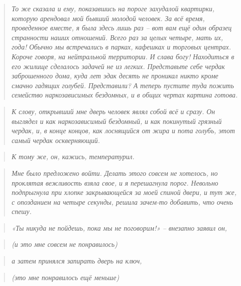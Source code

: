 \documentclass[
  a5paperpaper,
  DIV=11,
  numbers=noendperiod]{scrreprt}
\begin{document}
\begin{quote}
\emph{То же сказала и ему, показавшись на пороге захудалой квартирки,
которую арендовал мой бывший молодой человек. За всё время, проведенное
вместе, я была здесь лишь раз -- вот вам ещё один образец странности
наших отношений. Всего раз за целых четыре, мать их, года! Обычно мы
встречались в парках, кафешках и торговых центрах. Короче говоря, на
нейтральной территории. И слава богу! Находиться в его жилище сделалось
задачей не из легких. Представьте себе чердак заброшенного дома, куда
лет эдак десять не проникал никто кроме смачно гадящих голубей.
Представили? А теперь пустите туда пожить семейство наркозависимых
бездомных, и в общих чертах картина готова.}
\end{quote}

\begin{quote}
\emph{К слову, открывший мне дверь человек являл собой всё и сразу. Он
выглядел и как наркозависимый бездомный, и как покинутый грязный чердак,
и, в конце концов, как лоснящийся от жира и пота голубь, этот самый
чердак оскверняющий.}
\end{quote}

\begin{quote}
\emph{К тому же, он, кажись, температурил.}
\end{quote}

\begin{quote}
\emph{Мне было предложено войти. Делать этого совсем не хотелось, но
проклятая вежливость взяла свое, и я перешагнула порог. Невольно
подпрыгнула при хлопке закрывающейся за моей спиной двери, и тут же, с
опозданием на четыре секунды, решила зачем-то добавить, что очень
спешу.}
\end{quote}

\begin{quote}
\emph{«Ты никуда не пойдешь, пока мы не поговорим!» -- внезапно заявил
он,}
\end{quote}

\begin{quote}
\emph{(и это мне совсем не понравилось)}
\end{quote}

\begin{quote}
\emph{а затем принялся запирать дверь на ключ,}
\end{quote}

\begin{quote}
\emph{(это мне понравилось ещё меньше)}
\end{quote}
\end{document}
